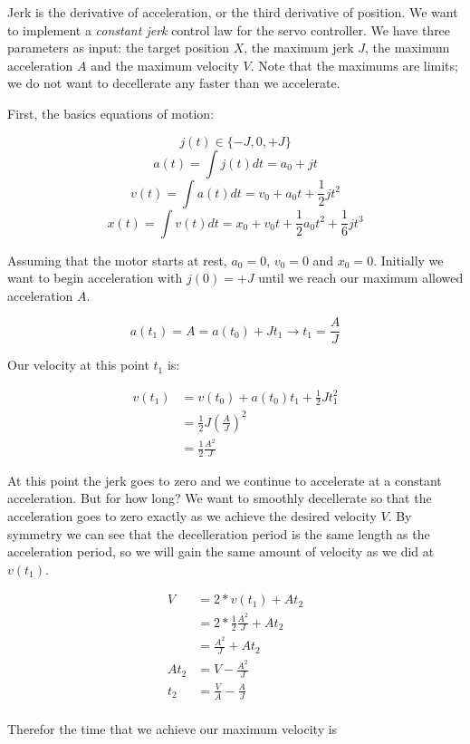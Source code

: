 \documentclass{article}
\begin{document}
Jerk is the derivative of acceleration, or the third derivative of position.
We want to implement a {\em constant jerk} control law for the servo
controller.  We have three parameters as input: the target position $X$,
the maximum jerk $J$, the maximum acceleration $A$ and the maximum
velocity $V$.  Note that the maximums are limits; we do not want to
decellerate any faster than we accelerate.

First, the basics equations of motion:

\newcommand{\half}{\frac{1}{2}}

$$j(t) \in \{ -J, 0, +J \}$$
$$a(t) = \int j(t) dt = a_0 + j t$$
$$v(t) = \int a(t) dt = v_0 + a_0 t + \half j t^2$$
$$x(t) = \int v(t) dt = x_0 + v_0 t + \half a_0 t^2 + \frac{1}{6} j t^3$$

Assuming that the motor starts at rest, $a_0 = 0$, $v_0 = 0$ and $x_0 = 0$.
Initially we want to begin acceleration with $j(0) = +J$ until we reach
our maximum allowed acceleration $A$.

$$a(t_1) = A = a(t_0) + J t_1 \rightarrow t_1 = \frac{A}{J}$$

Our velocity at this point $t_1$ is:

\begin{align}
v(t_1) &= v(t_0) + a(t_0) t_1 + \half J t_1^2 \\
       &= \half J (\frac{A}{J})^2 \\
       &= \half \frac{A^2}{J}
\end{align}

At this point the jerk goes to zero and we continue to accelerate
at a constant acceleration. But for how long? We want to smoothly
decellerate so that the acceleration goes to zero exactly as we
achieve the desired velocity $V$.  By symmetry we can see that the
decelleration period is the same length as the acceleration period,
so we will gain the same amount of velocity as we did at $v(t_1)$.

\begin{align}
V &= 2 * v(t_1) + A t_2 \\
  &= 2 * \half \frac{A^2}{J} + A t_2 \\
  &= \frac{A^2}{J} + A t_2 \\
A t_2 &= V - \frac{A^2}{J} \\
  t_2 &= \frac{V}{A} - \frac{A}{J} \\
\end{align}

Therefor the time that we achieve our maximum velocity is
\end{document}

